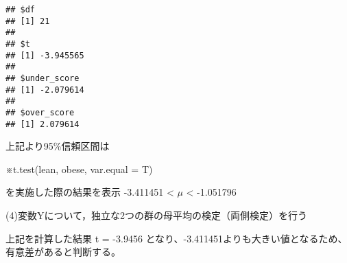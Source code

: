 \documentclass[
]{article}
\begin{document}
\begin{verbatim}
## $df
## [1] 21
## 
## $t
## [1] -3.945565
## 
## $under_score
## [1] -2.079614
## 
## $over_score
## [1] 2.079614
\end{verbatim}

上記より95\%信頼区間は

※t.test(lean, obese, var.equal = T)

を実施した際の結果を表示 -3.411451 \textless{} \(\mu\) \textless{}
-1.051796

(4)変数Yについて，独立な2つの群の母平均の検定（両側検定）を行う

上記を計算した結果 t = -3.9456
となり、-3.411451よりも大きい値となるため、有意差があると判断する。
\end{document}
